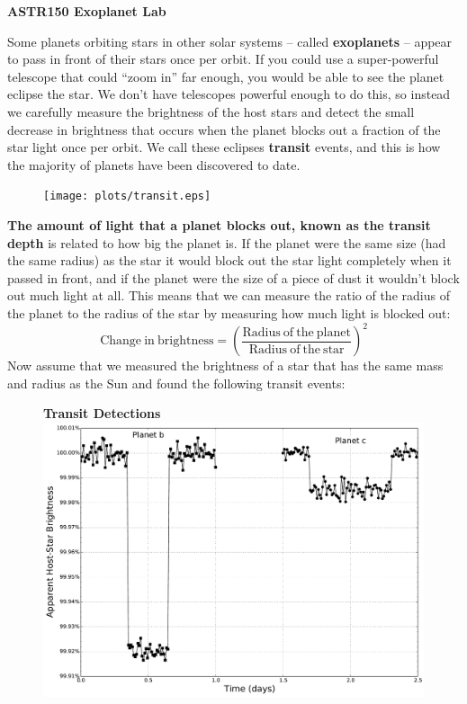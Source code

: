 \documentclass[12pt]{article}
\begin{document}

\begin{center}
\bf ASTR150 Exoplanet Lab
\end{center}

Some planets orbiting stars in other solar systems -- called {\bf exoplanets} -- appear to pass in front of their stars once per orbit. If you could use a super-powerful telescope that could ``zoom in'' far enough, you would be able to see the planet eclipse the star. We don't have telescopes powerful enough to do this, so instead we carefully measure the brightness of the host stars and detect the small decrease in brightness that occurs when the planet blocks out a fraction of the star light once per orbit.  We call these eclipses {\bf transit} events, and this is how the majority of planets have been discovered to date.
\begin{figure}[h!]
\centering
\texttt{[image: plots/transit.eps]}
\end{figure}

{\bf The amount of light that a planet blocks out, known as the transit depth} is related to how big the planet is. If the planet were the same size (had the same radius) as the star it would block out the star light completely when it passed in front, and if the planet were the size of a piece of dust it wouldn't block out much light at all. This means that we can measure the ratio of the radius of the planet to the radius of the star by measuring how much light is blocked out: 
\begin{equation}
\mathrm{Change~in~brightness} = \left( \frac{\mathrm{Radius~of~the~planet}}{\mathrm{Radius~of~the~star}} \right)^2 \label{eqn:depth}
\end{equation}
Now assume that we measured the brightness of a star that has the same mass and radius as the Sun and found the following transit events:
\begin{figure}[h!]
\centering
{\bf Transit Detections} \\
\includegraphics[scale=0.5]{plots/faketransit.pdf}
\end{figure}
\end{document}
